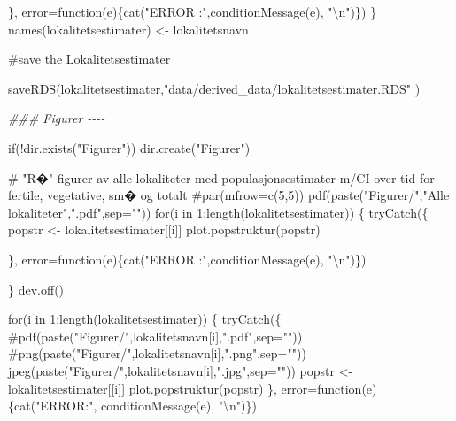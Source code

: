 \documentclass[
  letterpaper,
  DIV=11,
  numbers=noendperiod]{scrreport}
\newenvironment{Shaded}{\begin{snugshade}}{\end{snugshade}}
\newcommand{\AttributeTok}[1]{\textcolor[rgb]{0.40,0.45,0.13}{#1}}
\newcommand{\CommentTok}[1]{\textcolor[rgb]{0.37,0.37,0.37}{#1}}
\newcommand{\ControlFlowTok}[1]{\textcolor[rgb]{0.00,0.23,0.31}{#1}}
\newcommand{\DecValTok}[1]{\textcolor[rgb]{0.68,0.00,0.00}{#1}}
\newcommand{\DocumentationTok}[1]{\textcolor[rgb]{0.37,0.37,0.37}{\textit{#1}}}
\newcommand{\FunctionTok}[1]{\textcolor[rgb]{0.28,0.35,0.67}{#1}}
\newcommand{\NormalTok}[1]{\textcolor[rgb]{0.00,0.23,0.31}{#1}}
\newcommand{\OtherTok}[1]{\textcolor[rgb]{0.00,0.23,0.31}{#1}}
\newcommand{\SpecialCharTok}[1]{\textcolor[rgb]{0.37,0.37,0.37}{#1}}
\newcommand{\StringTok}[1]{\textcolor[rgb]{0.13,0.47,0.30}{#1}}
\begin{document}
\begin{Shaded}
\begin{Highlighting}[]
\NormalTok{  \}, }\AttributeTok{error=}\ControlFlowTok{function}\NormalTok{(e)\{}\FunctionTok{cat}\NormalTok{(}\StringTok{"ERROR :"}\NormalTok{,}\FunctionTok{conditionMessage}\NormalTok{(e), }\StringTok{"}\SpecialCharTok{\textbackslash{}n}\StringTok{"}\NormalTok{)\})}
\NormalTok{  \}}
\FunctionTok{names}\NormalTok{(lokalitetsestimater) }\OtherTok{\textless{}{-}}\NormalTok{ lokalitetsnavn}

\CommentTok{\#save the Lokalitetsestimater }

\FunctionTok{saveRDS}\NormalTok{(lokalitetsestimater,}\StringTok{"data/derived\_data/lokalitetsestimater.RDS"}\NormalTok{ )}

\DocumentationTok{\#\#\# Figurer {-}{-}{-}{-}}

\ControlFlowTok{if}\NormalTok{(}\SpecialCharTok{!}\FunctionTok{dir.exists}\NormalTok{(}\StringTok{"Figurer"}\NormalTok{)) }\FunctionTok{dir.create}\NormalTok{(}\StringTok{"Figurer"}\NormalTok{)}

\CommentTok{\# "R�" figurer av alle lokaliteter med populasjonsestimater m/CI over tid for fertile, vegetative, sm� og totalt}
\CommentTok{\#par(mfrow=c(5,5))}
\FunctionTok{pdf}\NormalTok{(}\FunctionTok{paste}\NormalTok{(}\StringTok{"Figurer/"}\NormalTok{,}\StringTok{"Alle lokaliteter"}\NormalTok{,}\StringTok{".pdf"}\NormalTok{,}\AttributeTok{sep=}\StringTok{""}\NormalTok{))}
\ControlFlowTok{for}\NormalTok{(i }\ControlFlowTok{in} \DecValTok{1}\SpecialCharTok{:}\FunctionTok{length}\NormalTok{(lokalitetsestimater))}
\NormalTok{\{}
  \FunctionTok{tryCatch}\NormalTok{(\{}
\NormalTok{  popstr }\OtherTok{\textless{}{-}}\NormalTok{ lokalitetsestimater[[i]]}
  \FunctionTok{plot.popstruktur}\NormalTok{(popstr)}
  
\NormalTok{\}, }\AttributeTok{error=}\ControlFlowTok{function}\NormalTok{(e)\{}\FunctionTok{cat}\NormalTok{(}\StringTok{"ERROR :"}\NormalTok{,}\FunctionTok{conditionMessage}\NormalTok{(e), }\StringTok{"}\SpecialCharTok{\textbackslash{}n}\StringTok{"}\NormalTok{)\})}
  
\NormalTok{\}}
\FunctionTok{dev.off}\NormalTok{()}

\ControlFlowTok{for}\NormalTok{(i }\ControlFlowTok{in} \DecValTok{1}\SpecialCharTok{:}\FunctionTok{length}\NormalTok{(lokalitetsestimater))}
\NormalTok{\{}
  \FunctionTok{tryCatch}\NormalTok{(\{}
  \CommentTok{\#pdf(paste("Figurer/",lokalitetsnavn[i],".pdf",sep=""))}
  \CommentTok{\#png(paste("Figurer/",lokalitetsnavn[i],".png",sep=""))}
  \FunctionTok{jpeg}\NormalTok{(}\FunctionTok{paste}\NormalTok{(}\StringTok{"Figurer/"}\NormalTok{,lokalitetsnavn[i],}\StringTok{".jpg"}\NormalTok{,}\AttributeTok{sep=}\StringTok{""}\NormalTok{))}
\NormalTok{  popstr }\OtherTok{\textless{}{-}}\NormalTok{ lokalitetsestimater[[i]]}
  \FunctionTok{plot.popstruktur}\NormalTok{(popstr)}
\NormalTok{  \}, }\AttributeTok{error=}\ControlFlowTok{function}\NormalTok{(e)\{}\FunctionTok{cat}\NormalTok{(}\StringTok{"ERROR:"}\NormalTok{, }\FunctionTok{conditionMessage}\NormalTok{(e), }\StringTok{"}\SpecialCharTok{\textbackslash{}n}\StringTok{"}\NormalTok{)\})}


\end{Highlighting}
\end{Shaded}
\end{document}
